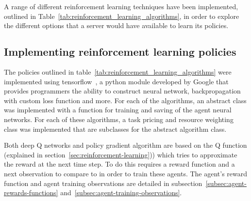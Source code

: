 A range of different reinforcement learning techniques have been implemented, outlined in
Table~\ref{tab:reinforcement_learning_algorithms}, in order to explore the different options that a server would have
available to learn its policies.

\subsection{Implementing reinforcement learning policies}\label{subsec:implementing-auction-and-resource-allocation-agents}
The policies outlined in table~\ref{tab:reinforcement_learning_algorithms} were implemented using
tensorflow~\citep{tensorflow2015-whitepaper}, a python module developed by Google
that provides programmers the ability to construct neural network, backpropagation with custom loss function and more.
For each of the algorithms, an abstract class was implemented with a function for training and saving of the agent
neural networks. For each of these algorithms, a task pricing and resource weighting class was implemented that are
subclasses for the abstract algorithm class.

Both deep Q networks and policy gradient algorithm are based on the Q function (explained in
section~\ref{sec:reinforcement-learning})) which tries to approximate the reward at the next time step. To do
this requires a reward function and a next observation to compare to in order to train these agents. The agent's
reward function and agent training observations are detailed in subsection~\ref{subsec:agent-rewards-functions}
and~\ref{subsec:agent-training-observations}.

